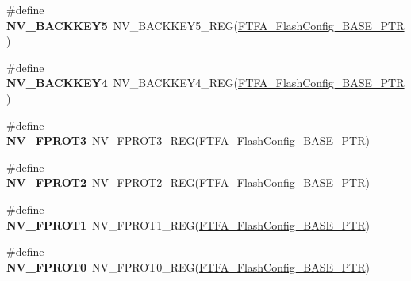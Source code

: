 \begin{DoxyCompactItemize}
\item 
\mbox{\label{group___n_v___register___accessor___macros_ga7b8e49b6530c2192672343b7f32ae5e8}} 
\#define {\bfseries N\+V\+\_\+\+B\+A\+C\+K\+K\+E\+Y5}~N\+V\+\_\+\+B\+A\+C\+K\+K\+E\+Y5\+\_\+\+R\+EG(\hyperlink{group___n_v___peripheral_ga3458652dfc38239f92682556e63596b5}{F\+T\+F\+A\+\_\+\+Flash\+Config\+\_\+\+B\+A\+S\+E\+\_\+\+P\+TR})
\item 
\mbox{\label{group___n_v___register___accessor___macros_ga5f7ba38a88074b8b658dfe992c73482c}} 
\#define {\bfseries N\+V\+\_\+\+B\+A\+C\+K\+K\+E\+Y4}~N\+V\+\_\+\+B\+A\+C\+K\+K\+E\+Y4\+\_\+\+R\+EG(\hyperlink{group___n_v___peripheral_ga3458652dfc38239f92682556e63596b5}{F\+T\+F\+A\+\_\+\+Flash\+Config\+\_\+\+B\+A\+S\+E\+\_\+\+P\+TR})
\item 
\mbox{\label{group___n_v___register___accessor___macros_ga04c3d23d8164e3fb7fb4f3e011869b5a}} 
\#define {\bfseries N\+V\+\_\+\+F\+P\+R\+O\+T3}~N\+V\+\_\+\+F\+P\+R\+O\+T3\+\_\+\+R\+EG(\hyperlink{group___n_v___peripheral_ga3458652dfc38239f92682556e63596b5}{F\+T\+F\+A\+\_\+\+Flash\+Config\+\_\+\+B\+A\+S\+E\+\_\+\+P\+TR})
\item 
\mbox{\label{group___n_v___register___accessor___macros_gaedf00f22b7dabfa124aeb38cdd5fb8a8}} 
\#define {\bfseries N\+V\+\_\+\+F\+P\+R\+O\+T2}~N\+V\+\_\+\+F\+P\+R\+O\+T2\+\_\+\+R\+EG(\hyperlink{group___n_v___peripheral_ga3458652dfc38239f92682556e63596b5}{F\+T\+F\+A\+\_\+\+Flash\+Config\+\_\+\+B\+A\+S\+E\+\_\+\+P\+TR})
\item 
\mbox{\label{group___n_v___register___accessor___macros_ga35eb345943dea70476ecc9f1cc3db473}} 
\#define {\bfseries N\+V\+\_\+\+F\+P\+R\+O\+T1}~N\+V\+\_\+\+F\+P\+R\+O\+T1\+\_\+\+R\+EG(\hyperlink{group___n_v___peripheral_ga3458652dfc38239f92682556e63596b5}{F\+T\+F\+A\+\_\+\+Flash\+Config\+\_\+\+B\+A\+S\+E\+\_\+\+P\+TR})
\item 
\mbox{\label{group___n_v___register___accessor___macros_gabd1755172d62e3c49cb9e79d2065a147}} 
\#define {\bfseries N\+V\+\_\+\+F\+P\+R\+O\+T0}~N\+V\+\_\+\+F\+P\+R\+O\+T0\+\_\+\+R\+EG(\hyperlink{group___n_v___peripheral_ga3458652dfc38239f92682556e63596b5}{F\+T\+F\+A\+\_\+\+Flash\+Config\+\_\+\+B\+A\+S\+E\+\_\+\+P\+TR})

\end{DoxyCompactItemize}
